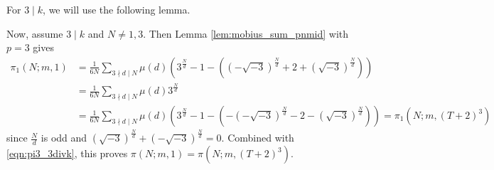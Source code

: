 \documentclass[10pt,reqno]{amsproc}
\newcommand{\1}{\mathds{1}}	%
\theoremstyle{definition}
\theoremstyle{remark}
\begin{document}
For $3 \mid k$, we will use the following lemma.


Now, assume $3 \mid k$ and $N \ne 1, 3$. Then Lemma \ref{lem:mobius_sum_pnmid} with $p = 3$ gives
\begin{align*}
    \pi_1(N; m, 1) &= \frac{1}{6N} \sum_{3 \nmid d \mid N} \mu(d) \left(3^{\frac{N}{d}} - 1 - \left((-\sqrt{-3})^{\frac{N}{d}} + 2 + (\sqrt{-3})^{\frac{N}{d}}\right)\right) \\
    &= \frac{1}{6N} \sum_{3 \nmid d \mid N} \mu(d) 3^{\frac{N}{d}} \\
    &= \frac{1}{6N} \sum_{3 \nmid d \mid N} \mu(d) \left(3^{\frac{N}{d}} - 1 - \left(-(-\sqrt{-3})^{\frac{N}{d}} - 2 - (\sqrt{-3})^{\frac{N}{d}}\right)\right) = \pi_1(N; m, (T+2)^3)
\end{align*}
since $\frac{N}{d}$ is odd and $(\sqrt{-3})^{\frac{N}{d}} + (-\sqrt{-3})^{\frac{N}{d}} = 0$.
Combined with \eqref{eqn:pi3_3divk}, this proves $\pi(N; m, 1) = \pi(N; m, (T+2)^3)$.
\end{document}
